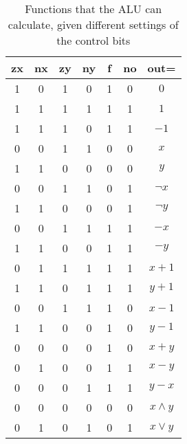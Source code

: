 \begin{table}[h]
    \begin{center}
        \begin{tabular}{ccccccc}
            \toprule
            \textbf{zx} & \textbf{nx} & \textbf{zy} &
            \textbf{ny} & \textbf{f} & \textbf{no} & \textbf{out=}
            \tabularnewline
            \midrule

            1  &  0  &  1  &  0  &  1  &  0  &   $0$  \\

            1  &  1  &  1  &  1  &  1  &  1  &   $1$  \\

            1  &  1  &  1  &  0  &  1  &  1  &   $-1$  \\

            0  &  0  &  1  &  1  &  0  &  0  &   $x$  \\

            1  &  1  &  0  &  0  &  0  &  0  &   $y$  \\

            0  &  0  &  1  &  1  &  0  &  1  &   $\neg x$  \\

            1  &  1  &  0  &  0  &  0  &  1  &   $\neg y$  \\

            0  &  0  &  1  &  1  &  1  &  1  &   $-x$  \\

            1  &  1  &  0  &  0  &  1  &  1  &   $-y$  \\

            0  &  1  &  1  &  1  &  1  &  1  &   $x + 1$  \\

            1  &  1  &  0  &  1  &  1  &  1  &   $y + 1$  \\

            0  &  0  &  1  &  1  &  1  &  0  &   $x - 1$  \\

            1  &  1  &  0  &  0  &  1  &  0  &   $y - 1$  \\

            0  &  0  &  0  &  0  &  1  &  0  &   $x + y$  \\

            0  &  1  &  0  &  0  &  1  &  1  &   $x - y$  \\

            0  &  0  &  0  &  1  &  1  &  1  &   $y - x$  \\

            0  &  0  &  0  &  0  &  0  &  0  &   $x \wedge y$  \\

            0  &  1  &  0  &  1  &  0  &  1  &   $x \vee y$  \\

            \bottomrule
        \end{tabular}
    \end{center}
    \label{tab:alu-functions}
    \caption{Functions that the ALU can calculate, given different settings of the control bits}
\end{table}
